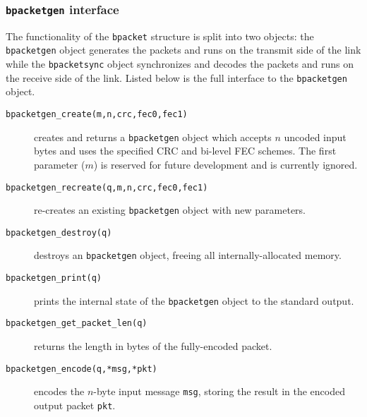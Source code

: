 \subsubsection{{\tt bpacketgen} interface}
\label{module:framing:bpacket:bpacketgen}
The functionality of the {\tt bpacket} structure is split into two
objects:
the {\tt bpacketgen} object generates the packets and runs on the
transmit side of the link while
the {\tt bpacketsync} object synchronizes and decodes the packets and
runs on the receive side of the link.
Listed below is the full interface to the {\tt bpacketgen} object.
%
\begin{description}
\item[{\tt bpacketgen\_create(m,n,crc,fec0,fec1)}]
    creates and returns a {\tt bpacketgen} object which accepts $n$
    uncoded input bytes and uses the specified CRC and bi-level FEC
    schemes.
    The first parameter ($m$) is reserved for future development and is
    currently ignored.
\item[{\tt bpacketgen\_recreate(q,m,n,crc,fec0,fec1)}]
    re-creates an existing {\tt bpacketgen} object with new parameters.
\item[{\tt bpacketgen\_destroy(q)}]
    destroys an {\tt bpacketgen} object, freeing all
    internally-allocated memory.
\item[{\tt bpacketgen\_print(q)}]
    prints the internal state of the {\tt bpacketgen} object to the
    standard output.
\item[{\tt bpacketgen\_get\_packet\_len(q)}]
    returns the length in bytes of the fully-encoded packet.
\item[{\tt bpacketgen\_encode(q,*msg,*pkt)}]
    encodes the $n$-byte input message {\tt msg},
    storing the result in the encoded output packet {\tt pkt}.
\end{description}
%


